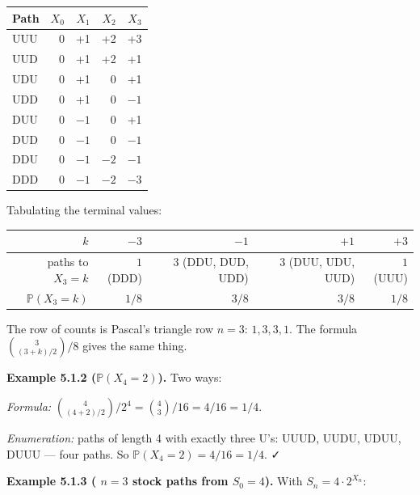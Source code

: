 \documentclass[
  10pt,
  twoside]{book}
\newcounter{none} %
\begin{document}
{\def\LTcaptype{none} %
\begin{table}[H]
\centering
\begin{tabular}{|l|r|r|r|r|}
\toprule
Path & \(X_0\) & \(X_1\) & \(X_2\) & \(X_3\) \\
\midrule



UUU & 0 & +1 & +2 & +3 \\
UUD & 0 & +1 & +2 & +1 \\
UDU & 0 & +1 & 0 & +1 \\
UDD & 0 & +1 & 0 & \(-1\) \\
DUU & 0 & \(-1\) & 0 & +1 \\
DUD & 0 & \(-1\) & 0 & \(-1\) \\
DDU & 0 & \(-1\) & \(-2\) & \(-1\) \\
DDD & 0 & \(-1\) & \(-2\) & \(-3\) \\
\bottomrule
\end{tabular}
\end{table}
}

Tabulating the terminal values:

{\def\LTcaptype{none} %
\begin{table}[H]
\centering
\begin{tabular}{|r|r|r|r|r|}
\toprule
\(k\) & \(-3\) & \(-1\) & \(+1\) & \(+3\) \\
\midrule



paths to \(X_3 = k\) & \(1\) (DDD) & \(3\) (DDU, DUD, UDD) & \(3\) (DUU,
UDU, UUD) & \(1\) (UUU) \\
\(\mathbb P(X_3 = k)\) & \(1/8\) & \(3/8\) & \(3/8\) & \(1/8\) \\
\bottomrule
\end{tabular}
\end{table}
}

The row of counts is Pascal's triangle row \(n = 3\): \(1, 3, 3, 1\).
The formula \(\binom{3}{(3+k)/2}/8\) gives the same thing.

\textbf{Example 5.1.2 (\(\mathbb P(X_4 = 2)\)).} Two ways:

\emph{Formula:}
\(\binom{4}{(4+2)/2}/2^4 = \binom{4}{3}/16 = 4/16 = 1/4\).

\emph{Enumeration:} paths of length 4 with exactly three U's: UUUD,
UUDU, UDUU, DUUU --- four paths. So \(\mathbb P(X_4 = 2) = 4/16 = 1/4\).
✓

\textbf{Example 5.1.3 ( \(n=3\) stock paths from \(S_0 = 4\)).} With
\(S_n = 4 \cdot 2^{X_n}\):
\end{document}
